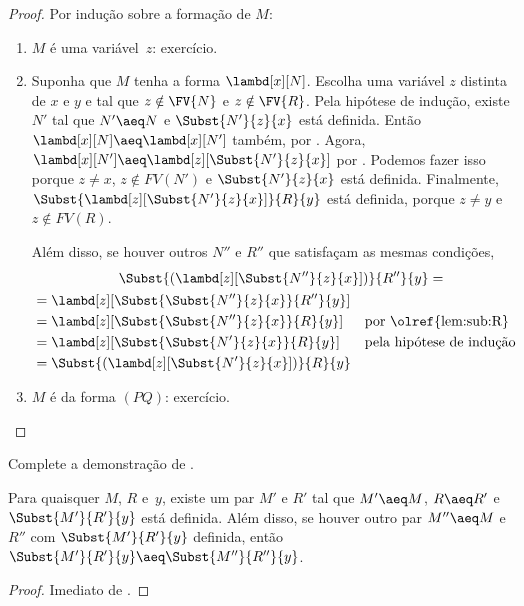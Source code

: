 \documentclass[../../../include/open-logic-section]{subfiles}
\begin{document}
\begin{proof}
  Por indução sobre a formação de $M$:
  \begin{enumerate}
  \item $M$ é uma variável~$z$: exercício.
  \item Suponha que $M$ tenha a forma $\lambd[x][N]$. Escolha uma variável
    $z$ distinta de $x$ e $y$ e tal que $z \notin \FV{N}$ e
    $z \notin \FV{R}$. Pela hipótese de indução, existe $N'$ tal que
    $N' \aeq N$ e $\Subst{N'}{z}{x}$ está definida. Então
    $\lambd[x][N] \aeq \lambd[x][N']$ também, por
    . Agora,
    $\lambd[x][N'] \aeq \lambd[z][\Subst{N'}{z}{x}]$ por
    . Podemos fazer isso porque
    $z \ne x$, $z \notin FV(N')$ e $\Subst{N'}{z}{x}$ está definida.
    Finalmente, $\Subst{\lambd[z][\Subst{N'}{z}{x}]}{R}{y}$ está definida,
    porque $z \neq y$ e $z \notin FV(R)$.

    Além disso, se houver outros $N''$ e $R''$ que satisfaçam as mesmas
    condições,
    \begin{multline*}
      \Subst{(\lambd[z][\Subst{N''}{z}{x}])}{R''}{y} =\\
    \begin{aligned}
      &= \lambd[z][\Subst{\Subst{N''}{z}{x}}{R''}{y}] \\
      &= \lambd[z][\Subst{\Subst{N''}{z}{x}}{R}{y}] && \text{por
        \olref{lem:sub:R}}\\
      &=\lambd[z][\Subst{\Subst{N'}{z}{x}}{R}{y}]
      && \text{pela hipótese de
        indução}\\
      &=\Subst{(\lambd[z][\Subst{N'}{z}{x}])}{R}{y}
    \end{aligned}
    \end{multline*}
    \item $M$ é da forma $(PQ)$: exercício.
  \end{enumerate}
\end{proof}

\begin{prob}
  Complete a demonstração de .
\end{prob}

\begin{cor}
  Para quaisquer $M$, $R$ e~$y$, existe um par $M'$ e $R'$ tal que
  $M' \aeq M$, $R \aeq R'$ e $\Subst{M'}{R'}{y}$ está definida. Além disso,
  se houver outro par $M'' \aeq M$ e $R''$ com $\Subst{M'}{R'}{y}$ definida,
  então $\Subst{M'}{R'}{y} \aeq \Subst{M''}{R''}{y}$.
\end{cor}

\begin{proof}
  Imediato de .
\end{proof}
\end{document}
